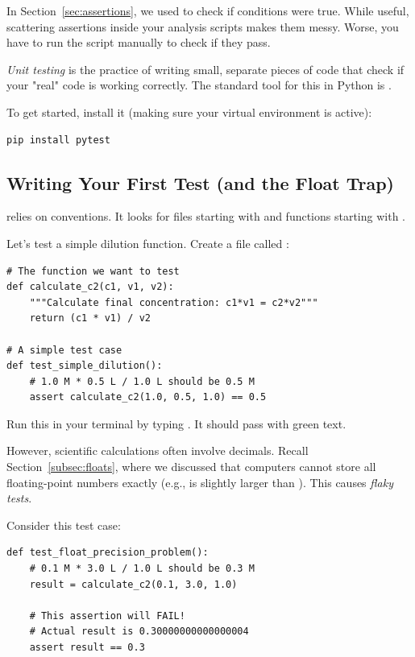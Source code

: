In Section~\ref{sec:assertions}, we used  to check if conditions were true. While useful, scattering assertions inside your analysis scripts makes them messy. Worse, you have to run the script manually to check if they pass.

\emph{Unit testing} is the practice of writing small, separate pieces of code that check if your "real" code is working correctly. The standard tool for this in Python is .

To get started, install it (making sure your virtual environment is active):

\begin{lstlisting}
pip install pytest
\end{lstlisting}

\subsection{Writing Your First Test (and the Float Trap)}

 relies on conventions. It looks for files starting with  and functions starting with .

Let's test a simple dilution function. Create a file called :

\begin{lstlisting}
# The function we want to test
def calculate_c2(c1, v1, v2):
    """Calculate final concentration: c1*v1 = c2*v2"""
    return (c1 * v1) / v2

# A simple test case
def test_simple_dilution():
    # 1.0 M * 0.5 L / 1.0 L should be 0.5 M
    assert calculate_c2(1.0, 0.5, 1.0) == 0.5
\end{lstlisting}

Run this in your terminal by typing . It should pass with green text.

However, scientific calculations often involve decimals. Recall Section~\ref{subsec:floats}, where we discussed that computers cannot store all floating-point numbers exactly (e.g.,  is slightly larger than ). This causes \emph{flaky tests}.

Consider this test case:

\begin{lstlisting}
def test_float_precision_problem():
    # 0.1 M * 3.0 L / 1.0 L should be 0.3 M
    result = calculate_c2(0.1, 3.0, 1.0)
    
    # This assertion will FAIL!
    # Actual result is 0.30000000000000004
    assert result == 0.3
\end{lstlisting}

